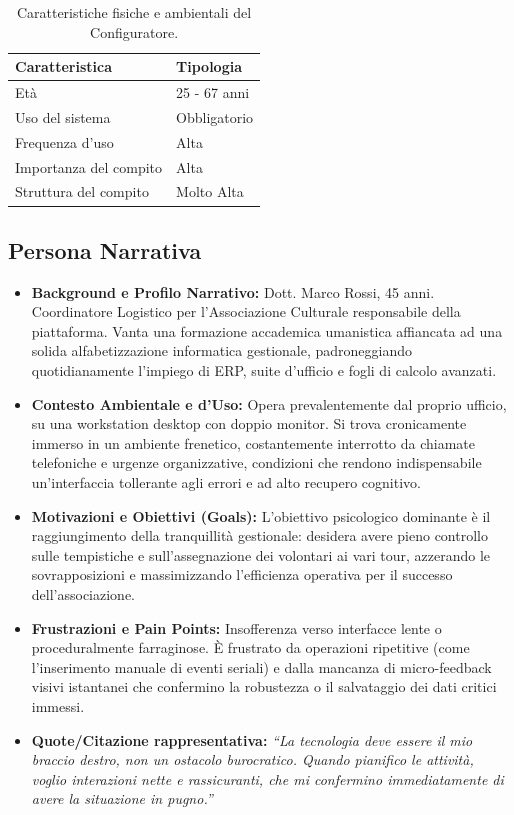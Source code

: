 \begin{table}[H]
\centering
\begin{tabular}{|l|l|}
\hline
\textbf{Caratteristica} & \textbf{Tipologia} \\ \hline
Età & 25 - 67 anni \\ \hline
Uso del sistema & Obbligatorio \\ \hline
Frequenza d'uso & Alta \\ \hline
Importanza del compito & Alta \\ \hline
Struttura del compito & Molto Alta \\ \hline
\end{tabular}
\caption{Caratteristiche fisiche e ambientali del Configuratore.}
\label{tab:conf_ambientali}
\end{table}

\subsection{Persona Narrativa}
\begin{itemize}
    \item \textbf{Background e Profilo Narrativo:} Dott. Marco Rossi, 45 anni. Coordinatore Logistico per l'Associazione Culturale responsabile della piattaforma. Vanta una formazione accademica umanistica affiancata ad una solida alfabetizzazione informatica gestionale, padroneggiando quotidianamente l'impiego di ERP, suite d'ufficio e fogli di calcolo avanzati.
    \item \textbf{Contesto Ambientale e d'Uso:} Opera prevalentemente dal proprio ufficio, su una workstation desktop con doppio monitor. Si trova cronicamente immerso in un ambiente frenetico, costantemente interrotto da chiamate telefoniche e urgenze organizzative, condizioni che rendono indispensabile un'interfaccia tollerante agli errori e ad alto recupero cognitivo.
    \item \textbf{Motivazioni e Obiettivi (Goals):} L'obiettivo psicologico dominante è il raggiungimento della tranquillità gestionale: desidera avere pieno controllo sulle tempistiche e sull'assegnazione dei volontari ai vari tour, azzerando le sovrapposizioni e massimizzando l'efficienza operativa per il successo dell'associazione.
    \item \textbf{Frustrazioni e Pain Points:} Insofferenza verso interfacce lente o proceduralmente farraginose. È frustrato da operazioni ripetitive (come l'inserimento manuale di eventi seriali) e dalla mancanza di micro-feedback visivi istantanei che confermino la robustezza o il salvataggio dei dati critici immessi.
    \item \textbf{Quote/Citazione rappresentativa:} \textit{``La tecnologia deve essere il mio braccio destro, non un ostacolo burocratico. Quando pianifico le attività, voglio interazioni nette e rassicuranti, che mi confermino immediatamente di avere la situazione in pugno.''}
\end{itemize}

